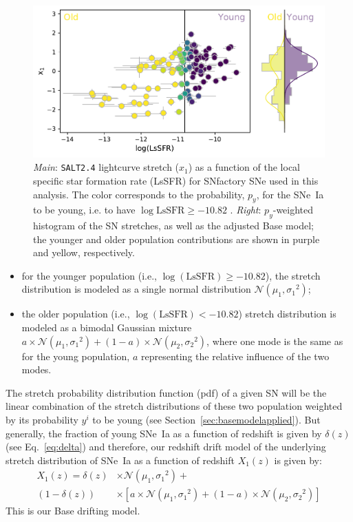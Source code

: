 \documentclass[]{aa}
\begin{document}
\begin{figure}
    \centering
    \includegraphics[width=0.8\linewidth]{Article_figures/model_base_hist.pdf}
    \caption{\textit{Main}: \textsc{\texttt{SALT2.4}} lightcurve stretch ($x_1$)
        as a function of the local specific star formation rate (LsSFR) for
        SNfactory SNe used in this analysis. The color corresponds to the
        probability, $p_y$, for the SNe~Ia to be young, i.e. to have
        $\log\mathrm{LsSFR} \geq -10.82$ \citep[see][]{rigault2020}.
        \textit{Right}: $p_y$-weighted histogram of the SN stretches, as well as
        the adjusted Base model; the younger and older population contributions
        are shown in purple and yellow, respectively.}
    \label{fig:stretchlssfr}
\end{figure}

\begin{itemize}
    \item for the younger population (i.e., $\log(\mathrm{LsSFR})\geq-10.82$),
        the stretch distribution is modeled as a single normal distribution
        $\mathcal{N}(\mu_1, \sigma_1{}^2)$; 
    \item the older population (i.e., $\log( \mathrm{LsSFR})<-10.82$) stretch
        distribution is modeled as a bimodal Gaussian mixture $a\times
        \mathcal{N}(\mu_1, \sigma_1{}^2) + (1-a)\times \mathcal{N}(\mu_2,
        \sigma_2{}^2)$, where one mode is the same as for the young population,
        $a$ representing the relative influence of the two modes.
\end{itemize}

The stretch probability distribution function (pdf) of a given SN will be the
linear combination of the stretch distributions of these two population weighted
by its probability $y^i$ to be young (see Section~\ref{sec:basemodelapplied}).
But generally, the fraction of young SNe~Ia as a function of redshift is given
by $\delta(z)$ (see Eq.~\ref{eq:delta}) and therefore, our redshift drift model
of the underlying stretch distribution of SNe~Ia as a function of redshift $X_1(z)$ is
given by:
\begin{align}\label{eq:stretchz}
    X_1(z) = \delta(z)&\times \mathcal{N}(\mu_1,\sigma_1{}^2) + \nonumber \\
    (1-\delta(z))&\times \left[ a\times\mathcal{N}(\mu_1,\sigma_1{}^2) +
    (1-a)\times\mathcal{N}(\mu_2,\sigma_2{}^2) \right]
\end{align}
This is our Base drifting model.
\end{document}
